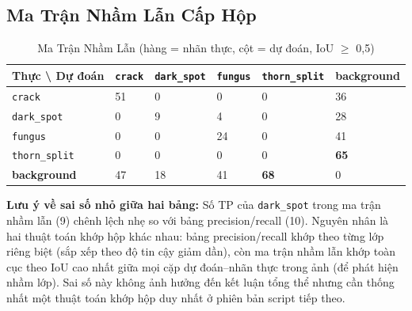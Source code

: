 \documentclass[12pt, a4paper]{article}
\begin{document}
\subsection{Ma Trận Nhầm Lẫn Cấp Hộp}

\begin{table}[H]
  \centering
  \caption{Ma Trận Nhầm Lẫn (hàng = nhãn thực, cột = dự đoán, IoU $\geq$ 0,5)}
  \begin{tabularx}{\linewidth}{L{2.6cm} C{1.1cm} C{2.0cm} C{1.3cm} C{2.6cm} C{1.9cm}}
    \toprule
    \textbf{Thực \textbackslash{} Dự đoán} & \texttt{crack} & \texttt{dark\_spot} & \texttt{fungus} & \texttt{thorn\_split} & \textbf{background} \\
    \midrule
    \texttt{crack}        & 51 & 0  & 0  & 0  & 36 \\
    \texttt{dark\_spot}   & 0  & 9  & 4  & 0  & 28 \\
    \texttt{fungus}       & 0  & 0  & 24 & 0  & 41 \\
    \texttt{thorn\_split} & 0  & 0  & 0  & 0  & \textcolor{danger}{\textbf{65}} \\
    \textbf{background}   & 47 & 18 & 41 & \textcolor{danger}{\textbf{68}} & 0 \\
    \bottomrule
  \end{tabularx}
\end{table}

\begin{tcolorbox}[notebox]
\textbf{Lưu ý về sai số nhỏ giữa hai bảng:} Số TP của \texttt{dark\_spot} trong ma trận nhầm lẫn (9) chênh lệch nhẹ so với bảng precision/recall (10). Nguyên nhân là hai thuật toán khớp hộp khác nhau: bảng precision/recall khớp theo từng lớp riêng biệt (sắp xếp theo độ tin cậy giảm dần), còn ma trận nhầm lẫn khớp toàn cục theo IoU cao nhất giữa mọi cặp dự đoán--nhãn thực trong ảnh (để phát hiện nhầm lớp). Sai số này không ảnh hưởng đến kết luận tổng thể nhưng cần thống nhất một thuật toán khớp hộp duy nhất ở phiên bản script tiếp theo.
\end{tcolorbox}
\end{document}
